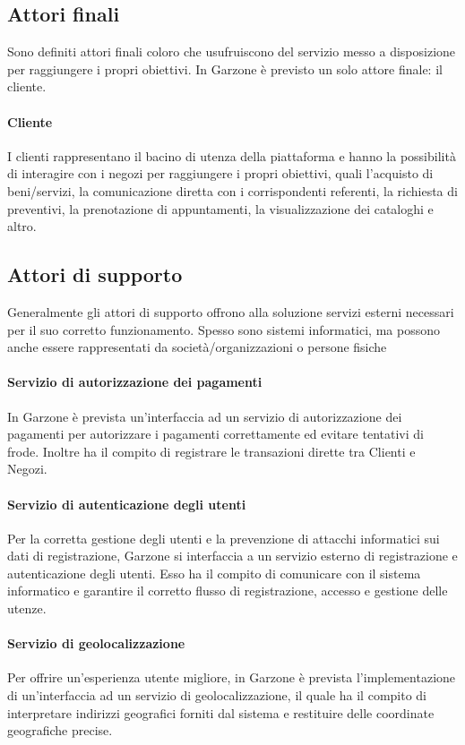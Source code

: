 \subsection{Attori finali}
Sono definiti attori finali coloro che usufruiscono del servizio messo a disposizione per raggiungere i propri obiettivi. In Garzone è previsto un solo attore finale: il cliente.
\paragraph{Cliente}
I clienti rappresentano il bacino di utenza della piattaforma e hanno la possibilità di interagire con i negozi per raggiungere i propri obiettivi, quali l'acquisto di beni/servizi, la comunicazione diretta con i corrispondenti referenti, la richiesta di preventivi, la prenotazione di appuntamenti, la visualizzazione dei cataloghi e altro.
\subsection{Attori di supporto}
Generalmente gli attori di supporto offrono alla soluzione servizi esterni necessari per il suo corretto funzionamento. Spesso sono sistemi informatici, ma possono anche essere rappresentati da società/organizzazioni o persone fisiche
\paragraph{Servizio di autorizzazione dei pagamenti} In Garzone è prevista un'interfaccia ad un servizio di autorizzazione dei pagamenti per autorizzare i pagamenti correttamente ed evitare tentativi di frode. Inoltre ha il compito di registrare le transazioni dirette tra Clienti e Negozi.
\paragraph{Servizio di autenticazione degli utenti} Per la corretta gestione degli utenti e la prevenzione di attacchi informatici sui dati di registrazione, Garzone si interfaccia a un servizio esterno di registrazione e autenticazione degli utenti. Esso ha il compito di comunicare con il sistema informatico e garantire il corretto flusso di registrazione, accesso e gestione delle utenze.
\paragraph{Servizio di geolocalizzazione} Per offrire un'esperienza utente migliore, in Garzone è prevista l'implementazione di un'interfaccia ad un servizio di geolocalizzazione, il quale ha il compito di interpretare indirizzi geografici forniti dal sistema e restituire delle coordinate geografiche precise.
